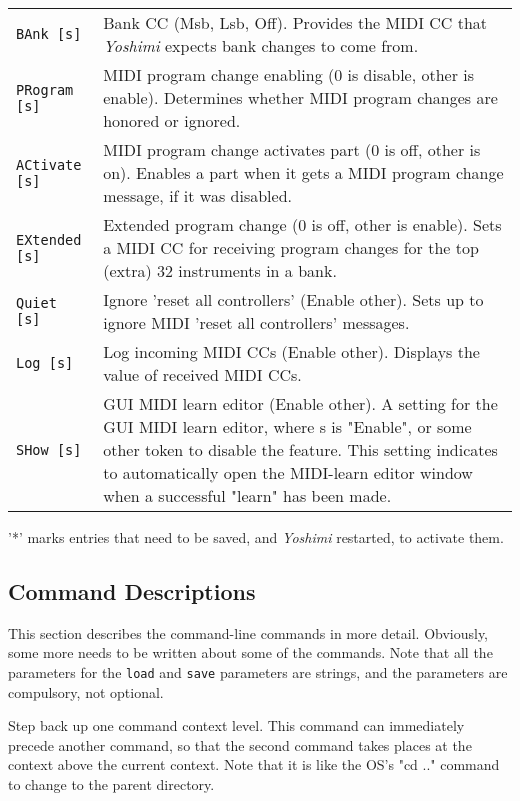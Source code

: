 \begin{center}
\begin{longtable}{p{4cm} p{10cm}}
\texttt{BAnk [s]} &
   Bank CC (Msb, Lsb, Off).
   Provides the MIDI CC that \textsl{Yoshimi} expects
   bank changes to come from.  \\
\texttt{PRogram [s]} &
   MIDI program change enabling (0 is disable, other is enable).
   Determines whether MIDI program changes are honored or ignored.  \\
\texttt{ACtivate [s]} &
   MIDI program change activates part (0 is off, other is on).
   Enables a part when it gets a MIDI program change message,
   if it was disabled.  \\
\texttt{EXtended [s]} &
   Extended program change (0 is off, other is enable).
   Sets a MIDI CC for receiving program changes for the top (extra)
   32 instruments in a bank.  \\
\texttt{Quiet [s]} &
   Ignore 'reset all controllers' (Enable other).
   Sets up to ignore MIDI 'reset all controllers' messages. \\
\texttt{Log [s]} &
   Log incoming MIDI CCs (Enable other).
   Displays the value of received MIDI CCs. \\
\texttt{SHow [s]} &
   GUI MIDI learn editor (Enable other).
   A setting for the GUI MIDI learn editor, where s is "Enable", or some
   other token to disable the feature.
   This setting indicates to automatically open the MIDI-learn editor window
   when a successful "learn" has been made.  \\

\end{longtable}
\end{center}

   '*' marks entries that need to be saved, and \textsl{Yoshimi}
   restarted, to activate them.

\subsection{Command Descriptions}
\label{subsec:command_line_command_descriptions}

   This section describes the command-line commands in more detail.
   Obviously, some more needs to be written about some of the commands.
   Note that all the parameters for the \texttt{load} and \texttt{save}
   parameters are strings, and the parameters are compulsory, not optional.

   \setcounter{ItemCounter}{0}      %

      Step back up one command context level.
      This command can immediately precede another command, so that the second
      command takes places at the context above the current context.
      Note that it is like the OS's "cd .." command to change to the parent
      directory.

